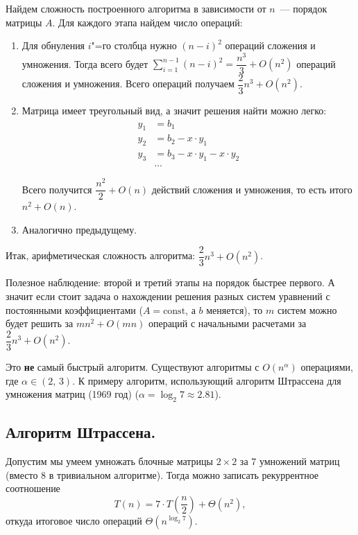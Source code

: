 Найдем сложность построенного алгоритма в зависимости от $n$~--- порядок матрицы $A$.
Для каждого этапа найдем число операций:
\begin{enumerate}[label=\protect\circled{\arabic*}]
	\item Для обнуления $i$"=го столбца нужно $(n-i)^2$ операций сложения и умножения. Тогда всего будет
	      $\sum\limits_{i=1}^{n-1} (n-i)^2=\dfrac{n^3}{3}+O(n^2)$ операций сложения и умножения.
	      Всего операций получаем $\dfrac{2}{3}n^3+O(n^2)$.
	\item Матрица имеет треугольный вид, а значит решения найти можно легко:
	      \begin{align*}
		      y_1 & =b_1                       \\
		      y_2 & =b_2-x\cdot y_1            \\
		      y_3 & =b_3-x\cdot y_1-x\cdot y_2 \\
		          & \ldots
	      \end{align*}

	      Всего получится $\dfrac{n^2}{2}+O(n)$ действий сложения и умножения, то есть итого $n^2+O(n)$.
	\item Аналогично предыдущему.
\end{enumerate}

Итак, арифметическая сложность алгоритма: $\dfrac{2}{3}n^3+O(n^2)$.

\begin{remark}
	Полезное наблюдение: второй и третий этапы на порядок быстрее первого. А значит если стоит задача
	о нахождении решения разных систем уравнений с постоянными коэффициентами ($A=\text{const}$,
	а $b$ меняется), то $m$ систем можно будет решить за $mn^2+O(mn)$
	операций с начальными расчетами за $\dfrac{2}{3}n^3+O(n^2)$.
\end{remark}

\begin{remark}
	Это \textbf{не} самый быстрый алгоритм. Существуют алгоритмы с $O(n^{\alpha})$ операциями, где
	$\alpha\in (2,\, 3)$. К примеру алгоритм, использующий алгоритм Штрассена для умножения
	матриц (1969 год) ($\alpha=\log_{2}7\approx 2.81$).
\end{remark}

\subsection{Алгоритм Штрассена.}
Допустим мы умеем умножать блочные матрицы $2\times 2$ за 7 умножений матриц (вместо 8 в тривиальном алгоритме).
Тогда можно записать рекуррентное соотношение
\[
	T(n) = 7\cdot T\left(\frac{n}{2}\right)+\Theta(n^2),
\]
откуда итоговое число операций $\Theta(n^{\log_2 7})$.

